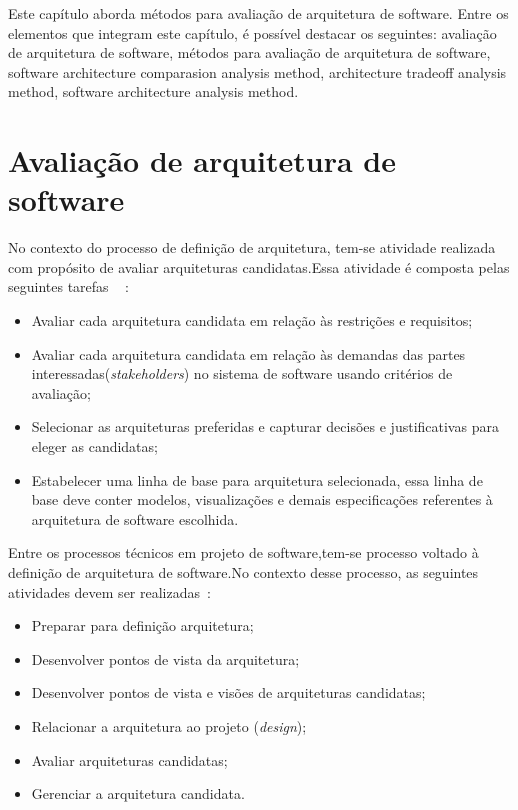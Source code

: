 Este capítulo aborda métodos para avaliação de arquitetura de software. Entre os elementos que integram este capítulo, é possível destacar os seguintes: avaliação de arquitetura de software, métodos para avaliação de arquitetura de software, software architecture comparasion analysis method, architecture tradeoff analysis method, software architecture analysis method.

\section{Avaliação de arquitetura de software}

No contexto do processo de definição de arquitetura, tem-se atividade realizada com propósito de avaliar arquiteturas candidatas.Essa atividade é composta pelas seguintes tarefas ~\cite{ISO_12207} :
\begin{itemize}
    \item Avaliar cada arquitetura candidata em relação às restrições e requisitos;
    \item Avaliar cada arquitetura candidata em relação às demandas das partes interessadas(\emph{stakeholders}) no sistema de software usando critérios de avaliação;
    \item Selecionar as arquiteturas preferidas e capturar decisões e justificativas para eleger as candidatas;
    \item Estabelecer uma linha de base para arquitetura selecionada, essa linha de base deve conter modelos, visualizações e demais especificações referentes à arquitetura de software escolhida.
\end{itemize}

Entre os processos técnicos em projeto de software,tem-se processo voltado à definição de arquitetura de software.No contexto desse processo, as seguintes atividades devem ser realizadas~\cite{ISO_12207}:

\begin{itemize}
    \item Preparar para definição arquitetura;
    \item Desenvolver  pontos de vista da arquitetura;
    \item Desenvolver pontos de vista e visões de arquiteturas candidatas;
    \item Relacionar a arquitetura ao projeto (\emph{design});
    \item Avaliar arquiteturas candidatas;
    \item Gerenciar a arquitetura candidata.
\end{itemize}


